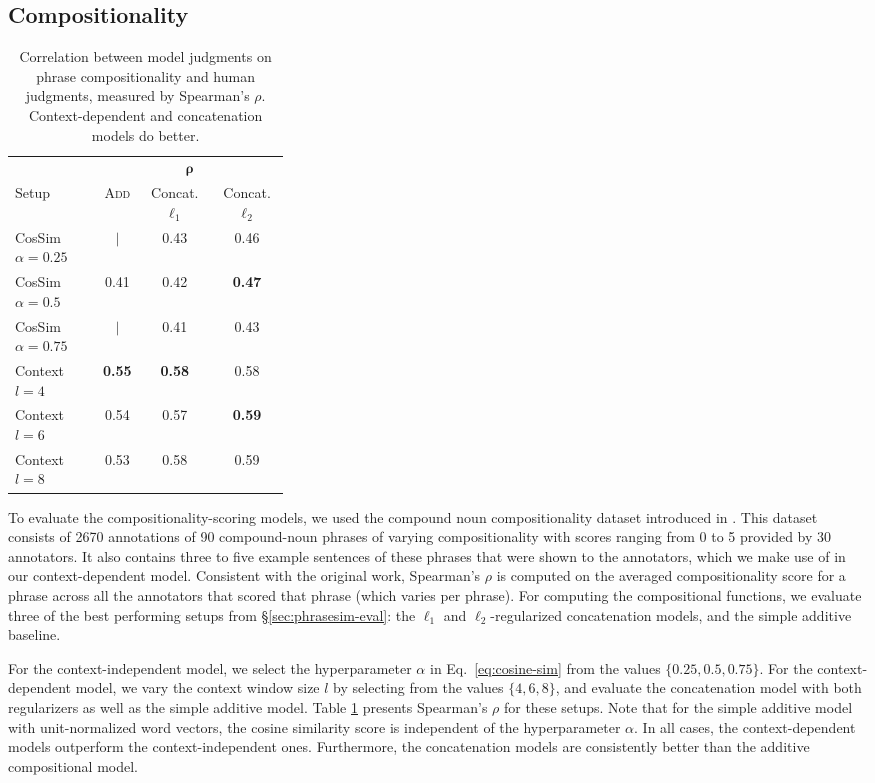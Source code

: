 \documentclass[11pt,letterpaper]{article}
\begin{document}
\subsection{Compositionality}
\label{sec:compo-eval}
\begin{table}[h!]
	\small
  \begin{center}
    \begin{tabular}{p{0.32\linewidth}ccc}
      \hline
      & \multicolumn{3}{c}{$\bm{\rho}$} \\
	  Setup & \textsc{Add} & Concat. $\ell_1$ & Concat. $\ell_2$ \\
	  \hline
      CosSim $\alpha=0.25$ & $\mid$ & 0.43 & 0.46 \\
	  CosSim $\alpha=0.5$ &  0.41 & 0.42 & {\bf 0.47} \\
	  CosSim $\alpha=0.75$ & $\mid$ & 0.41 & 0.43 \\
	  \hline 
	  Context $l=4$ & {\bf 0.55} & {\bf 0.58} & 0.58 \\
      Context $l=6$ & 0.54 & 0.57 & {\bf 0.59} \\
	  Context $l=8$  & 0.53 & 0.58 & 0.59 \\
	\end{tabular}
  \end{center}
  \caption{Correlation between model judgments on phrase compositionality and human judgments, measured by Spearman's $\rho$. Context-dependent and concatenation models do better.}
  \label{tab:comp-results}
\end{table}

To evaluate the compositionality-scoring models, we used the compound noun compositionality dataset introduced in .  
This dataset consists of 2670 annotations of 90 compound-noun phrases of varying compositionality with scores ranging from 0 to 5 provided by 30 annotators. 
It also contains three to five example sentences of these phrases that were shown to the annotators, which we make use of in our context-dependent model. 
Consistent with the original work, Spearman's $\rho$ is computed on the averaged compositionality score for a phrase across all the annotators that scored that phrase (which varies per phrase). 
For computing the compositional functions, we evaluate three of the best performing setups from \S\ref{sec:phrasesim-eval}: the $\ell_1$ and $\ell_2$-regularized concatenation models, and the simple additive baseline. 

For the context-independent model, we select the hyperparameter $\alpha$ in Eq.~\ref{eq:cosine-sim} from the values $\{0.25, 0.5, 0.75\}$. 
For the context-dependent model, we vary the context window size $l$ by selecting from the values $\{4, 6, 8\}$, and evaluate the concatenation model with both regularizers as well as the simple additive model.
Table \ref{tab:comp-results} presents Spearman's $\rho$ for these setups. 
Note that for the simple additive model with unit-normalized word vectors, the cosine similarity score is independent of the hyperparameter $\alpha$.
In all cases, the context-dependent models outperform the context-independent ones. 
Furthermore, the concatenation models are consistently better than the additive compositional model. 
\end{document}
